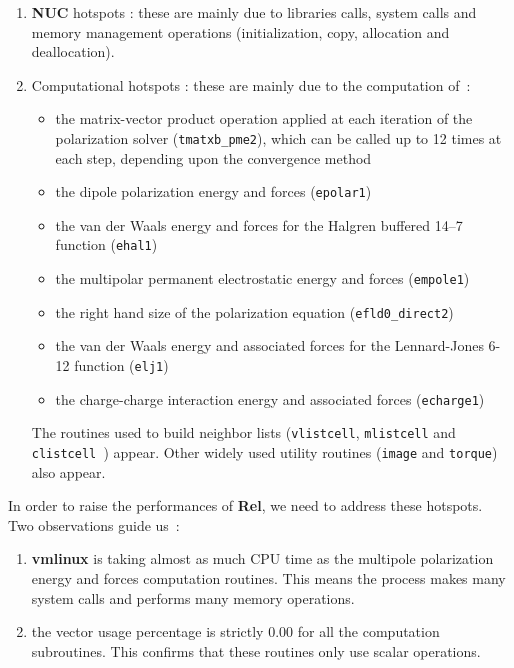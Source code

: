 \documentclass[9pt,comparison]{livecoms}
\newcommand{\lv}{\Large\verb}
\begin{document}
\label{Hotspots}
\begin{enumerate}
\item \textbf{NUC} hotspots : these are mainly due to libraries calls, system calls and memory management operations (initialization, copy, allocation and deallocation). 
\item Computational hotspots : these are mainly due to the computation of~:
\begin{itemize}
    \item the matrix-vector product operation applied at each iteration of the polarization solver ({\color{codepurple}\lv|tmatxb_pme2|}), which can be called up to 12 times at each step, depending upon the convergence method 
    \item the dipole polarization energy and forces ({\color{codepurple}\lv|epolar1|})
    \item the van der Waals energy and forces for the Halgren buffered 14–7 function ({\color{codepurple}\lv|ehal1|})
    \item the multipolar permanent electrostatic energy and forces ({\color{codepurple}\lv|empole1|})
    \item the right hand size of the polarization equation ({\color{codepurple}\lv|efld0_direct2|})
    \item the van der Waals energy and associated forces for the Lennard-Jones 6-12 function ({\color{codepurple}\lv|elj1|})
    \item the charge-charge interaction energy and associated forces  ({\color{codepurple}\lv|echarge1|})
\end{itemize}

The routines used to build neighbor lists ({\color{codepurple}\lv|vlistcell|}, {\color{codepurple}\lv|mlistcell|} and {\color{codepurple}\lv|clistcell |}) appear. Other widely used utility routines ({\color{codepurple}\lv|image|} and {\color{codepurple}\lv|torque|}) also appear.  
\end{enumerate}
In order to raise the performances of \textbf{Rel}, we need to address these hotspots. Two observations guide us~:
\begin{enumerate}
    \item \textbf{vmlinux} is taking almost as much CPU time as the multipole polarization energy and forces computation routines. This means the process makes many system calls and performs many memory operations. 
    \item the vector usage percentage is strictly $0.00$ for all the computation subroutines. This confirms that these routines only use scalar operations.
\end{enumerate}
\end{document}
